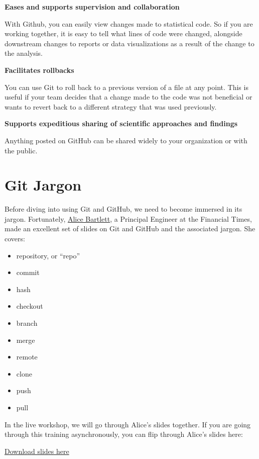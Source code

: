 \documentclass[
]{book}
\providecommand{\tightlist}{%
  \setlength{\itemsep}{0pt}\setlength{\parskip}{0pt}}
\begin{document}
\textbf{Eases and supports supervision and collaboration}

With Github, you can easily view changes made to statistical code. So if
you are working together, it is easy to tell what lines of code were changed,
alongside downstream changes to reports or data visualizations as a result of the
change to the analysis.

\textbf{Facilitates rollbacks}

You can use Git to roll back to a previous version of a file at any point. This
is useful if your team decides that a change made to the code was not beneficial
or wants to revert back to a different strategy that was used previously.

\textbf{Supports expeditious sharing of scientific approaches and findings}

Anything posted on GitHub can be shared widely to your organization or with
the public.

\chapter{Git Jargon}\label{git-jargon}

Before diving into using Git and GitHub, we need to become immersed in its
jargon. Fortunately, \href{https://github.com/alicebartlett}{Alice Bartlett}, a
Principal Engineer at the Financial Times, made an excellent set of slides on
Git and GitHub and the associated jargon. She covers:

\begin{itemize}
\tightlist
\item
  repository, or ``repo''
\item
  commit
\item
  hash
\item
  checkout
\item
  branch
\item
  merge
\item
  remote
\item
  clone
\item
  push
\item
  pull
\end{itemize}

In the live workshop, we will go through Alice's slides together. If you are
going through this training asynchronously, you can flip through Alice's slides
here:

\href{https://bph-storage.s3.us-west-1.amazonaws.com/git-for-humans/git-for-designers.pdf}{Download slides here}
\end{document}

